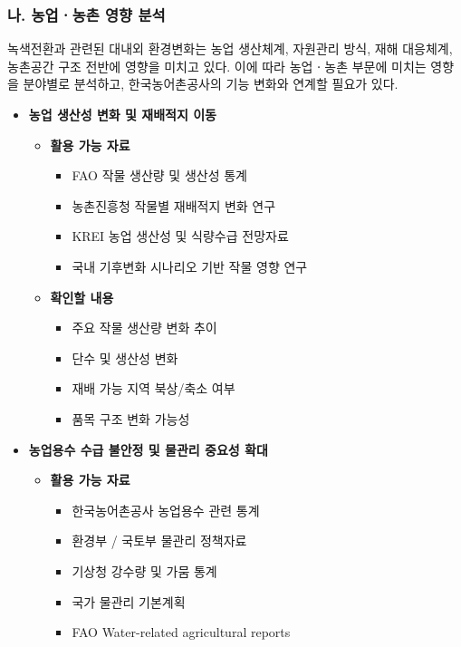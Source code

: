 \subsubsection*{나. 농업ㆍ농촌 영향 분석}

녹색전환과 관련된 대내외 환경변화는 농업 생산체계, 자원관리 방식,
재해 대응체계, 농촌공간 구조 전반에 영향을 미치고 있다.
이에 따라 농업ㆍ농촌 부문에 미치는 영향을 분야별로 분석하고,
한국농어촌공사의 기능 변화와 연계할 필요가 있다.

\begin{itemize}

    \item \textbf{농업 생산성 변화 및 재배적지 이동}

    \begin{itemize}
        \item \textbf{활용 가능 자료}
        \begin{itemize}
            \item FAO 작물 생산량 및 생산성 통계
            \item 농촌진흥청 작물별 재배적지 변화 연구
            \item KREI 농업 생산성 및 식량수급 전망자료
            \item 국내 기후변화 시나리오 기반 작물 영향 연구
        \end{itemize}

        \item \textbf{확인할 내용}
        \begin{itemize}
            \item 주요 작물 생산량 변화 추이
            \item 단수 및 생산성 변화
            \item 재배 가능 지역 북상/축소 여부
            \item 품목 구조 변화 가능성
        \end{itemize}
    \end{itemize}

    \item \textbf{농업용수 수급 불안정 및 물관리 중요성 확대}

    \begin{itemize}
        \item \textbf{활용 가능 자료}
        \begin{itemize}
            \item 한국농어촌공사 농업용수 관련 통계
            \item 환경부 / 국토부 물관리 정책자료
            \item 기상청 강수량 및 가뭄 통계
            \item 국가 물관리 기본계획
            \item FAO Water-related agricultural reports
        \end{itemize}


\end{itemize}
\end{itemize}
